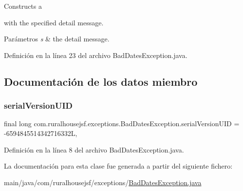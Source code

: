 Constructs a
\begin{DoxyCode}{0}
\end{DoxyCode}
 with the specified detail message.


\begin{DoxyParams}{Parámetros}
{\em s} & the detail message. \\
\hline
\end{DoxyParams}


Definición en la línea 23 del archivo Bad\+Dates\+Exception.\+java.



\subsection{Documentación de los datos miembro}
\mbox{\label{classcom_1_1ruralhousejsf_1_1exceptions_1_1_bad_dates_exception_a455e5569f117b53852ac14206bb2177f}} 
\subsubsection{\texorpdfstring{serialVersionUID}{serialVersionUID}}
{\footnotesize\ttfamily final long com.\+ruralhousejsf.\+exceptions.\+Bad\+Dates\+Exception.\+serial\+Version\+U\+ID = -\/6594845514342716332L\hspace{0.3cm}{\ttfamily [static]}, {\ttfamily [private]}}



Definición en la línea 8 del archivo Bad\+Dates\+Exception.\+java.



La documentación para esta clase fue generada a partir del siguiente fichero\+:\begin{DoxyCompactItemize}
\item 
main/java/com/ruralhousejsf/exceptions/\mbox{\hyperlink{_bad_dates_exception_8java}{Bad\+Dates\+Exception.\+java}}\end{DoxyCompactItemize}
